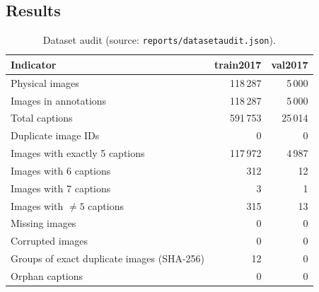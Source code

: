 \documentclass[11pt,a4paper]{article}
\renewcommand{\_}{\textunderscore\allowbreak{}}
\newcommand{\code}[1]{\texttt{#1}}
\begin{document}
\subsection{Results}
\begin{table}[H]
\centering
\begin{tabular}{@{}lrr@{}}
\toprule
\textbf{Indicator} & \textbf{train2017} & \textbf{val2017}\\
\midrule
Physical images & 118\,287 & 5\,000\\
Images in annotations & 118\,287 & 5\,000\\
Total captions & 591\,753 & 25\,014\\
Duplicate image IDs & 0 & 0\\
Images with exactly 5 captions & 117\,972 & 4\,987\\
Images with 6 captions & 312 & 12\\
Images with 7 captions & 3 & 1\\
Images with $\neq 5$ captions & 315 & 13\\
Missing images & 0 & 0\\
Corrupted images & 0 & 0\\
Groups of exact duplicate images (SHA-256) & 12 & 0\\
Orphan captions & 0 & 0\\
\bottomrule
\end{tabular}
\caption{Dataset audit (source: \code{reports/dataset\_audit.json}).}
\label{tab:audit}
\end{table}
\end{document}
